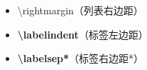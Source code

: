 ﻿\documentclass{article}
\begin{document}
\begin{itemize}
        \item \textbackslash{}rightmargin（列表右边距）
        \item \textbf{\textbackslash{}labelindent}（标签左边距）
        \item \textbf{\textbackslash{}labelsep*}（标签右边距*）
    \end{itemize}

\hrulefill
\end{document}
